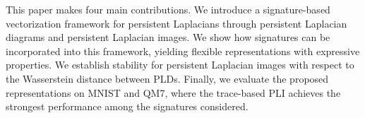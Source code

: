 \documentclass{article}
\begin{document}

This paper makes four main contributions. We introduce a signature-based vectorization framework for persistent Laplacians through persistent Laplacian diagrams and persistent Laplacian images. We show how signatures can be incorporated into this framework, yielding flexible representations with expressive properties. We establish stability for persistent Laplacian images with respect to the Wasserstein distance between PLDs. Finally, we evaluate the proposed representations on MNIST and QM7, where the trace-based PLI achieves the strongest performance among the signatures considered.


\end{document}

